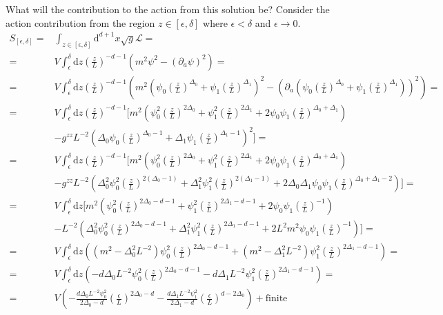 \documentclass[12pt]{article}
\renewcommand{\d}{\ensuremath{\mathrm{d}}}
\renewcommand{\L}{\ensuremath{\mathcal{L}}}
\begin{document}
What will the contribution to the action from this solution be? Consider the action contribution from the region $z\in[\epsilon,\delta]$ where $\epsilon<\delta$ and $\epsilon\rightarrow0$.
\begin{equation}
\begin{split}
 S_{[\epsilon,\delta]}=&\int_{z\in[\epsilon,\delta]}\d^{d+1} x\sqrt{g}\L=\\
=&V\int_\epsilon^\delta\d z \left(\frac{z}{L}\right)^{-d-1}\left(m^2\psi^2-(\partial_a\psi)^2\right)=\\
=&V\int_\epsilon^\delta\d z \left(\frac{z}{L}\right)^{-d-1}\left(m^2( \psi_0\left(\frac{z}{L}\right)^{\Delta_0}+\psi_1\left(\frac{z}{L}\right)^{\Delta_1} )^2-(\partial_a(\psi_0\left(\frac{z}{L}\right)^{\Delta_0}+\psi_1\left(\frac{z}{L}\right)^{\Delta_1}))^2\right)=\\
=&V\int_\epsilon^\delta\d z \left(\frac{z}{L}\right)^{-d-1}\Big[m^2 \left(\psi_0^2\left(\frac{z}{L}\right)^{2\Delta_0}+\psi_1^2\left(\frac{z}{L}\right)^{2\Delta_1}+2\psi_0\psi_1\left(\frac{z}{L}\right)^{\Delta_0+\Delta_1}\right) \\
&-g^{zz}L^{-2}(\Delta_0\psi_0\left(\frac{z}{L}\right)^{\Delta_0-1}+\Delta_1\psi_1\left(\frac{z}{L}\right)^{\Delta_1-1})^2\Big]=\\
=&V\int_\epsilon^\delta\d z\left(\frac{z}{L}\right)^{-d-1}\Big[m^2 \left(\psi_0^2\left(\frac{z}{L}\right)^{2\Delta_0}+\psi_1^2\left(\frac{z}{L}\right)^{2\Delta_1}+2\psi_0\psi_1\left(\frac{z}{L}\right)^{\Delta_0+\Delta_1}\right)\\
&-g^{zz}L^{-2}\left(\Delta_0^2\psi_0^2\left(\frac{z}{L}\right)^{2(\Delta_0-1)}+\Delta_1^2\psi_1^2\left(\frac{z}{L}\right)^{2(\Delta_1-1)}+
2\Delta_0\Delta_1\psi_0\psi_1\left(\frac{z}{L}\right)^{\Delta_0+\Delta_1-2}\right)\Big]=\\
=&V\int_\epsilon^\delta\d z\Big[m^2 \left(\psi_0^2\left(\frac{z}{L}\right)^{2\Delta_0-d-1}+\psi_1^2\left(\frac{z}{L}\right)^{2\Delta_1-d-1}+2\psi_0\psi_1\left(\frac{z}{L}\right)^{-1}\right)\\
&-L^{-2}\left(\Delta_0^2\psi_0^2\left(\frac{z}{L}\right)^{2\Delta_0-d-1}+\Delta_1^2\psi_1^2\left(\frac{z}{L}\right)^{2\Delta_1-d-1}+
2L^2m^2\psi_0\psi_1\left(\frac{z}{L}\right)^{-1}\right)\Big]=\\
=&V\int_\epsilon^\delta\d z \left((m^2-\Delta_0^2L^{-2})\psi_0^2\left(\frac{z}{L}\right)^{2\Delta_0-d-1}+(m^2-\Delta_1^2L^{-2})\psi_1^2\left(\frac{z}{L}\right)^{2\Delta_1-d-1}\right)=\\
=&V\int_\epsilon^\delta\d z \left(-d\Delta_0L^{-2}\psi_0^2\left(\frac{z}{L}\right)^{2\Delta_0-d-1}-d\Delta_1L^{-2}\psi_1^2\left(\frac{z}{L}\right)^{2\Delta_1-d-1}\right)=\\
=&V\left(-\frac{d\Delta_0L^{-2}\psi_0^2}{2\Delta_0-d}\left(\frac{\epsilon}{L}\right)^{2\Delta_0-d}-\frac{d\Delta_1L^{-2}\psi_1^2}{2\Delta_1-d}\left(\frac{\epsilon}{L}\right)^{d-2\Delta_0}\right)+\mathrm{finite}
\end{split}
\end{equation}
\end{document}
